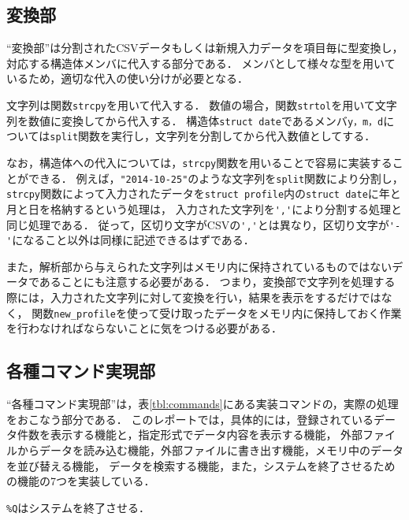 \documentclass[a4j,11pt]{jarticle}
\begin{document}
\subsection{変換部} \label{sec:exchange}

``変換部''は分割されたCSVデータもしくは新規入力データを項目毎に型変換し，
対応する構造体メンバに代入する部分である．
メンバとして様々な型を用いているため，適切な代入の使い分けが必要となる．

文字列は関数\verb|strcpy|を用いて代入する．
数値の場合，関数\verb|strtol|を用いて文字列を数値に変換してから代入する．
構造体\verb|struct date|であるメンバ\verb|y，m，d|については\verb|split|関数を実行し，文字列を分割してから代入数値としてする．

なお，構造体への代入については，\verb|strcpy|関数を用いることで容易に実装することができる．
例えば，\verb|"2014-10-25"|のような文字列を\verb|split|関数により分割し，
\verb|strcpy|関数によって入力されたデータを\verb|struct profile|内の\verb|struct date|に年と月と日を格納するという処理は，
入力された文字列を\verb|','|により分割する処理と同じ処理である．
従って，区切り文字がCSVの\verb|','|とは異なり，区切り文字が\verb|'-'|になること以外は同様に記述できるはずである．

また，解析部から与えられた文字列はメモリ内に保持されているものではないデータであることにも注意する必要がある．
つまり，変換部で文字列を処理する際には，入力された文字列に対して変換を行い，結果を表示をするだけではなく，
関数\verb|new_profile|を使って受け取ったデータをメモリ内に保持しておく作業を行わなければならないことに気をつける必要がある．

\subsection{各種コマンド実現部} \label{sec:command}

``各種コマンド実現部''は，表\ref{tbl:commands}にある実装コマンドの，実際の処理をおこなう部分である．
このレポートでは，具体的には，登録されているデータ件数を表示する機能と，指定形式でデータ内容を表示する機能，
外部ファイルからデータを読み込む機能，外部ファイルに書き出す機能，メモリ中のデータを並び替える機能，
データを検索する機能，また，システムを終了させるための機能の7つを実装している．

\verb|%Q|はシステムを終了させる．
\end{document}
